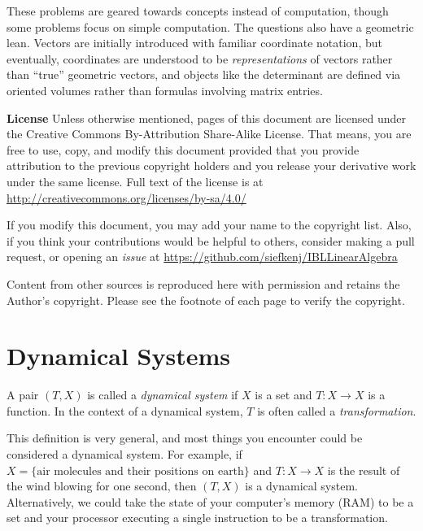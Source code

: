 {These problems are geared towards concepts instead of computation, though some problems
focus on simple computation. The questions also have a geometric lean. Vectors are initially
introduced with familiar coordinate notation, but eventually, coordinates are understood to be
\emph{representations} of vectors rather than ``true'' geometric vectors, and objects like the
determinant are defined via oriented volumes rather than formulas involving matrix entries.

\bigskip
{\bf License} Unless otherwise mentioned, pages of this document are licensed under
the Creative Commons By-Attribution Share-Alike License. That means, you are free
to use, copy, and modify this document provided that you provide attribution to the
previous copyright holders and you release your derivative work under the same license.
Full text of the license is at \url{http://creativecommons.org/licenses/by-sa/4.0/}

If you modify this document, you may add your name to the copyright list. Also,
if you think your contributions would be helpful to others, consider making a
pull request, or opening an \emph{issue} at \url{https://github.com/siefkenj/IBLLinearAlgebra}

Content from other sources is reproduced here with permission and retains the
Author's copyright. Please see the footnote of each page to verify the
copyright.

\newpage
}


\setcounter{page}{1}
\pagestyle{siefken}



	\section*{Dynamical Systems}

	\begin{definition}
		A pair $(T,X)$ is called a \emph{dynamical system} if
		$X$ is a set and $T:X\to X$ is a function. In the context of
		a dynamical system, $T$ is often called a \emph{transformation}.
	\end{definition}

	This definition is very general, and most things you encounter could be considered
	a dynamical system. For example, if $X=\{\text{air molecules and their positions on earth}\}$
	and $T:X\to X$ is the result of the wind blowing for one second, then $(T,X)$ is a dynamical system.
	Alternatively, we could take the state of your computer's memory (RAM) to be a set and your processor executing a single
	instruction to be a transformation.

